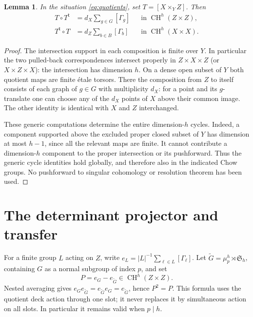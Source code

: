 \documentclass[11pt]{article}
\newtheorem{lemma}[theorem]{Lemma}
\theoremstyle{remark}\newtheorem{remark}[theorem]{Remark}
\newcommand{\CH}{\operatorname{CH}}\newcommand{\Sym}{\operatorname{Sym}}
\begin{document}
\begin{lemma}\label{lem:finite}
In the situation \eqref{eq:quotients}, set $T=[X\times_Y Z]$. Then
\begin{align*}
 T\circ T^{\mathsf t}&=d_X\sum_{g\in G}[\Gamma_g]
                        &&\text{in }\CH^h(Z\times Z),\\
 T^{\mathsf t}\circ T&=d_Z\sum_{b\in B}[\Gamma_b]
                        &&\text{in }\CH^h(X\times X).
\end{align*}
\end{lemma}
\begin{proof}
The intersection support in each composition is finite over $Y$. In particular the
two pulled-back correspondences intersect properly in $Z\times X\times Z$
(or $X\times Z\times X$): the intersection has dimension $h$.
On a dense open subset of $Y$ both quotient maps are finite \'etale torsors.
There the composition from $Z$ to itself consists of each graph of $g\in G$
with multiplicity $d_X$: for a point and its $g$-translate one can choose
any of the $d_X$ points of $X$ above their common image. The other identity
is identical with $X$ and $Z$ interchanged.

These generic computations determine the entire dimension-$h$ cycles.
Indeed, a component supported above the excluded proper closed subset of
$Y$ has dimension at most $h-1$, since all the relevant maps are finite.
It cannot contribute a dimension-$h$ component to the proper intersection
or its pushforward. Thus the generic cycle identities hold globally, and
therefore also in the indicated Chow groups. No pushforward to singular
cohomology or resolution theorem has been used.
\end{proof}

\section{The determinant projector and transfer}
For a finite group $L$ acting on $Z$, write
$e_L=|L|^{-1}\sum_{\ell\in L}[\Gamma_\ell]$. Let
$\widetilde G=\mu_p^h\rtimes\mathfrak S_h$, containing $G$ as a normal
subgroup of index $p$, and set
\begin{equation}\label{eq:P}
 P=e_G-e_{\widetilde G}\in\CH^h(Z\times Z).
\end{equation}
Nested averaging gives $e_Ge_{\widetilde G}=e_{\widetilde G}e_G
=e_{\widetilde G}$, hence $P^2=P$. This formula uses the quotient deck
action through one slot; it never replaces it by simultaneous action on
all slots. In particular it remains valid when $p\mid h$.
\end{document}

